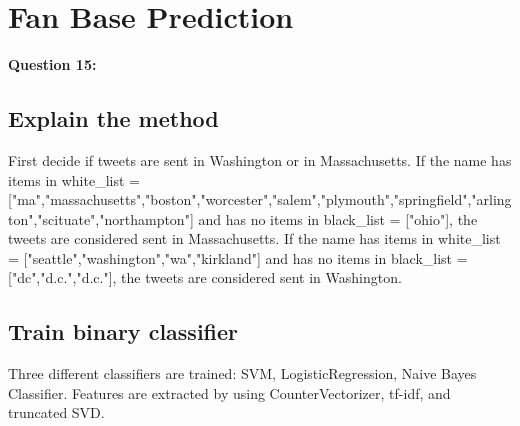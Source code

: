\documentclass{article}
\begin{document}
\begin{table}[h]
\center
\caption{Estimated number of tweets in the next time windows}
\label{tab:Q14}
\end{table}



\newpage

\section{Fan Base Prediction}
\textbf{Question 15:}
\subsection{Explain the method}
First decide if tweets are sent in Washington or in Massachusetts. If the name has items in white\_list = ["ma","massachusetts","boston","worcester","salem","plymouth","springfield","arlington","scituate","northampton"] and has no items in black\_list = ["ohio"], the tweets are considered sent in Massachusetts. If the name has items in white\_list = ["seattle","washington","wa","kirkland"] and has no items in black\_list = ["dc","d.c.","d.c."], the tweets are considered sent in Washington. 

\subsection{Train binary classifier}
Three different classifiers are trained: SVM, LogisticRegression, Naive Bayes Classifier. Features are extracted by using CounterVectorizer, tf-idf, and truncated SVD.  
\end{document}
